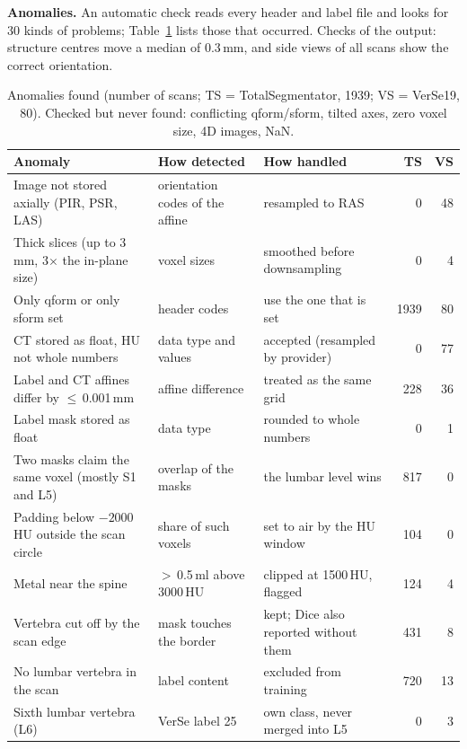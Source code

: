 \documentclass[10pt,a4paper]{article}
\begin{document}
\textbf{Anomalies.} An automatic check reads every header and label file and looks for 30 kinds of problems; Table~\ref{tab:anom} lists those that occurred. Checks of the output: structure centres move a median of 0.3\,mm, and side views of all scans show the correct orientation.

\begin{table}[h]
\centering\footnotesize
\caption{Anomalies found (number of scans; TS = TotalSegmentator, 1939; VS = VerSe19, 80). Checked but never found: conflicting qform/sform, tilted axes, zero voxel size, 4D images, NaN.}
\label{tab:anom}
\begin{tabularx}{\linewidth}{@{}l>{\raggedright\arraybackslash}X>{\raggedright\arraybackslash}Xrr@{}}
\toprule
Anomaly & How detected & How handled & TS & VS\\
\midrule
Image not stored axially (PIR, PSR, LAS) & orientation codes of the affine & resampled to RAS & 0 & 48\\
Thick slices (up to 3\,mm, 3$\times$ the in-plane size) & voxel sizes & smoothed before downsampling & 0 & 4\\
Only qform or only sform set & header codes & use the one that is set & 1939 & 80\\
CT stored as float, HU not whole numbers & data type and values & accepted (resampled by provider) & 0 & 77\\
Label and CT affines differ by $\le$\,0.001\,mm & affine difference & treated as the same grid & 228 & 36\\
Label mask stored as float & data type & rounded to whole numbers & 0 & 1\\
\midrule
Two masks claim the same voxel (mostly S1 and L5) & overlap of the masks & the lumbar level wins & 817 & 0\\
Padding below $-2000$\,HU outside the scan circle & share of such voxels & set to air by the HU window & 104 & 0\\
Metal near the spine & $>$\,0.5\,ml above 3000\,HU & clipped at 1500\,HU, flagged & 124 & 4\\
Vertebra cut off by the scan edge & mask touches the border & kept; Dice also reported without them & 431 & 8\\
No lumbar vertebra in the scan & label content & excluded from training & 720 & 13\\
Sixth lumbar vertebra (L6) & VerSe label 25 & own class, never merged into L5 & 0 & 3\\
\bottomrule
\end{tabularx}
\end{table}
\end{document}
